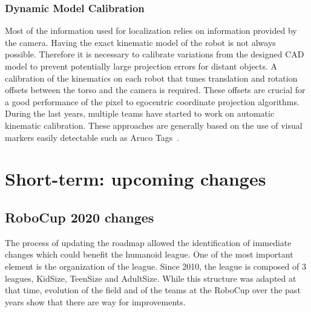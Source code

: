 \documentclass{article}
\begin{document}
\subsubsection{Dynamic Model Calibration}
Most of the information used for localization relies on information provided by the camera. 
Having the exact kinematic model of the robot is not always possible. 
Therefore it is necessary to calibrate variations from the designed CAD model to prevent potentially large projection errors for distant objects. 
A calibration of the kinematics on each robot that tunes translation and rotation offsets between the torso and the camera is required. 
These offsets are crucial for a good performance of the pixel to egocentric coordinate projection algorithms.
During the last years, multiple teams have started to work on automatic kinematic calibration. 
These approaches are generally based on the use of visual markers easily detectable such as Aruco Tags~\cite{Garrido-Jurado2014}.




\newpage

\section{\label{sec:ShortTerm}Short-term: upcoming changes}


\subsection{RoboCup 2020 changes}

The process of updating the roadmap allowed the identification of immediate changes which
could benefit the humanoid league.
One of the most important element is the organization of the league. Since 2010,
the league is composed of 3 leagues, KidSize, TeenSize and AdultSize.
While this structure was adapted at that time, evolution of the field and of the
teams at the RoboCup over the past years show that there are way for improvements.
\end{document}
